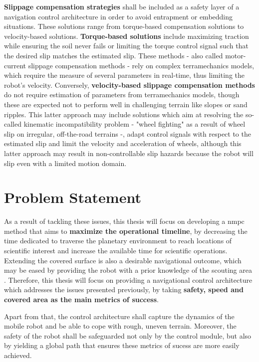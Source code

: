 \textbf{Slippage compensation strategies} \cite{Gonzalez2017} shall be included as a safety layer of a navigation control architecture in order to avoid entrapment or embedding situations. These solutions range from torque-based compensation solutions to velocity-based solutions. \textbf{Torque-based solutions} include maximizing traction while ensuring the soil never fails or limiting the torque control signal such that the desired slip matches the estimated slip. These methods - also called motor-current slippage compensation methods - rely on complex terramechanics models, which require the measure of several parameters in real-time, thus limiting the robot's velocity. Conversely, \textbf{velocity-based slippage compensation methods} do not require estimation of parameters from terramechanics models, though these are expected not to perform well in challenging terrain like slopes or sand ripples. This latter approach may include solutions which aim at resolving the so-called kinematic incompatibility problem \cite{Gonzalez2019} - "wheel fighting" as a result of wheel slip on irregular, off-the-road terrains -, adapt control signals with respect to the estimated slip and limit the velocity and acceleration of wheels, although this latter approach may result in non-controllable slip hazards because the robot will slip even with a limited motion domain.

\section{Problem Statement}
\label{section:problemStatement}

As a result of tackling these issues, this thesis will focus on developing a \acrlong{nmpc} method that aims to \textbf{maximize the operational timeline}, by decreasing the time dedicated to traverse the planetary environment to reach locations of scientific interest and increase the available time for scientific operations. Extending the covered surface is also a desirable navigational outcome, which may be eased by providing the robot with a prior knowledge of the scouting area \cite{Coombs2000, Urmson2004}. Therefore, this thesis will focus on providing a navigational control architecture which addresses the issues presented previously, by taking \textbf{safety, speed and covered area as the main metrics of success}.

Apart from that, the control architecture shall capture the dynamics of the mobile robot and be able to cope with rough, uneven terrain. Moreover, the safety of the robot shall be safeguarded not only by the control module, but also by yielding a global path that ensures these metrics of sucess are more easily achieved.

